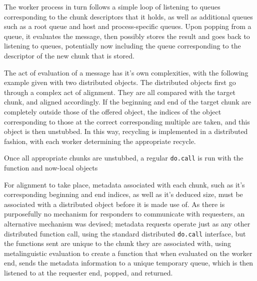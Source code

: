 The worker process in turn follows a simple loop of listening to queues corresponding to the chunk descriptors that it holds, as well as additional queues such as a root queue and host and process-specific queues. 
Upon popping from a queue, it evaluates the message, then possibly stores the result and goes back to listening to queues, potentially now including the queue corresponding to the descriptor of the new chunk that is stored.

The act of evaluation of a message has it's own complexities, with the following example given with two distributed objects.
The distributed objects first go through a complex act of alignment.
They are all compared with the target chunk, and aligned accordingly.
If the beginning and end of the target chunk are completely outside those of the offered object, the indices of the object corresponding to those at the correct corresponding multiple are taken, and this object is then unstubbed.
In this way, recycling is implemented in a distributed fashion, with each worker determining the appropriate recycle.

Once all appropriate chunks are unstubbed, a regular \texttt{do.call} is run with the function and now-local objects

For alignment to take place, metadata associated with each chunk, such as it's corresponding beginning and end indices, as well as it's deduced size, must be associated with a distributed object before it is made use of.
As there is purposefully no mechanism for responders to communicate with requesters, an alternative mechanism was devised; metadata requests operate just as any other distributed function call, using the standard distributed \texttt{do.call} interface, but the functions sent are unique to the chunk they are associated with, using metalinguistic evaluation to create a function that when evaluated on the worker end, sends the metadata information to a unique temporary queue, which is then listened to at the requester end, popped, and returned.
